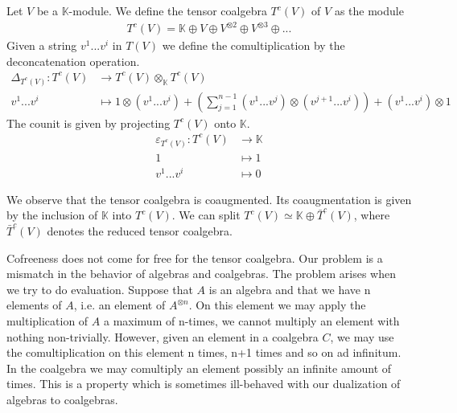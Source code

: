 \documentclass[../thesis.tex]{subfiles}
\begin{document}
            \begin{example}
                Let $V$ be a $\mathbb{K}$-module. We define the tensor coalgebra $T^c(V)$ of $V$ as the module
                \begin{align*}
                    T^c(V) = \mathbb{K}\oplus V\oplus V^{\otimes 2}\oplus V^{\otimes 3}\oplus ...
                \end{align*}
                Given a string $v^1...v^i$ in $T(V)$ we define the comultiplication by the deconcatenation operation.
                \begin{align*}
                    \Delta_{T^c(V)}:T^c(V) & \rightarrow T^c(V)\otimes_{\mathbb{K}}T^c(V) \\
                    v^1...v^i & \mapsto 1\otimes(v^1...v^i) + (\sum_{j=1}^{n-1} (v^1...v^{j})\otimes(v^{j+1}...v^i)) + (v^1...v^i)\otimes 1
                \end{align*}
                The counit is given by projecting $T^c(V)$ onto $\mathbb{K}$.
                \begin{align*}
                    \varepsilon_{T^c(V)} : T^c(V) & \rightarrow \mathbb{K} \\
                    1 & \mapsto 1 \\
                    v^1...v^i & \mapsto 0
                \end{align*}
            \end{example}

            We observe that the tensor coalgebra is coaugmented. Its coaugmentation is given by the inclusion of $\mathbb{K}$ into $T^c(V)$. We can split $T^c(V) \simeq \mathbb{K}\oplus \bar{T}^c(V)$, where $\bar{T}^c(V)$ denotes the reduced tensor coalgebra.

            Cofreeness does not come for free for the tensor coalgebra. Our problem is a mismatch in the behavior of algebras and coalgebras. The problem arises when we try to do evaluation. Suppose that $A$ is an algebra and that we have n elements of $A$, i.e. an element of $A^{\otimes n}$. On this element we may apply the multiplication of $A$ a maximum of n-times, we cannot multiply an element with nothing non-trivially. However, given an element in a coalgebra $C$, we may use the comultiplication on this element n times, n+1 times and so on ad infinitum. In the coalgebra we may comultiply an element possibly an infinite amount of times. This is a property which is sometimes ill-behaved with our dualization of algebras to coalgebras. 
            
\end{document}

